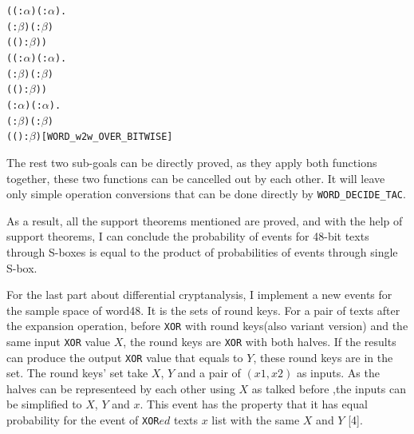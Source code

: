 \documentclass{article}
\begin{document}
\begin{alltt}
\HOLTokenTurnstile{} (\HOLSymConst{\HOLTokenForall{}}( :\ensuremath{\alpha} ) ( :\ensuremath{\alpha} ).
      (  :\ensuremath{\beta} ) \HOLSymConst{\&\&} (  :\ensuremath{\beta} ) \HOLSymConst{=}
      ( ( \HOLSymConst{\&\&} ) :\ensuremath{\beta} )) \HOLSymConst{\HOLTokenConj{}}
   (\HOLSymConst{\HOLTokenForall{}}( :\ensuremath{\alpha} ) ( :\ensuremath{\alpha} ).
      (  :\ensuremath{\beta} ) \HOLSymConst{\HOLTokenOr{}} (  :\ensuremath{\beta} ) \HOLSymConst{=}
      ( ( \HOLSymConst{\HOLTokenOr{}} ) :\ensuremath{\beta} )) \HOLSymConst{\HOLTokenConj{}}
   \HOLSymConst{\HOLTokenForall{}}( :\ensuremath{\alpha} ) ( :\ensuremath{\alpha} ).
     (  :\ensuremath{\beta} ) \HOLSymConst{\HOLTokenEor{}} (  :\ensuremath{\beta} ) \HOLSymConst{=}
     ( ( \HOLSymConst{\HOLTokenEor{}} ) :\ensuremath{\beta} )\hfill{[WORD_w2w_OVER_BITWISE]}
\end{alltt}

The rest two sub-goals can be directly proved, as they apply both functions together, these two functions can be cancelled out by each other. It will
leave only simple operation conversions that can be done directly by \verb|WORD_DECIDE_TAC|.

As a result, all the support theorems mentioned are proved, and with the help of support theorems, I can conclude the probability of events for
48-bit texts through S-boxes is equal to the product of probabilities of events through single S-box.

For the last part about differential cryptanalysis, I implement a new events for the sample space of word48. It is the sets of round
keys. For a pair of texts after the expansion operation, before \verb|XOR| with round keys(also variant version) and the same input \verb|XOR| value $X$,
the round keys are \verb|XOR| with
both halves. If the results can produce the output \verb|XOR| value that equals to $Y$, these round keys are in the set. The round keys' set
take $X$, $Y$ and a pair of $(x1,x2)$ as
inputs. As the halves can be representeed by each other using $X$ as talked before ,the inputs can be simplified to $X$, $Y$ and $x$. This event has
the property that it has equal probability for the event of \verb|XOR|$ed$ texts $x$ list with the same $X$ and $Y$ [4].
\end{document}
